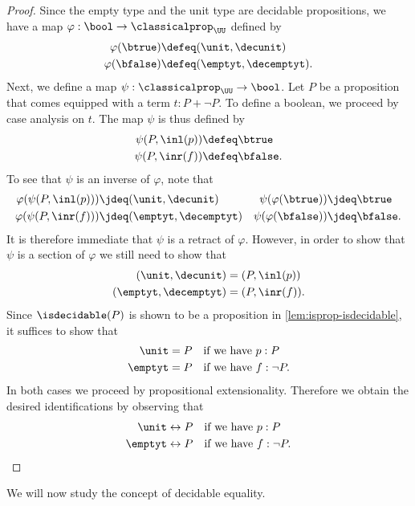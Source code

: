\begin{proof}
  Since the empty type and the unit type are decidable propositions, we have a map $\varphi:\bool\to\classicalprop_\UU$ defined by
  \begin{align*}
    \varphi(\btrue) & \defeq (\unit,\decunit) \\
    \varphi(\bfalse) & \defeq (\emptyt,\decemptyt).
  \end{align*}
  Next, we define a map $\psi:\classicalprop_\UU\to\bool$. Let $P$ be a proposition that comes equipped with a term $t:P+\neg P$. To define a boolean, we proceed by case analysis on $t$. The map $\psi$ is thus defined by
  \begin{align*}
    \psi(P,\inl(p)) & \defeq \btrue \\
    \psi(P,\inr(f)) & \defeq \bfalse.
  \end{align*}
  To see that $\psi$ is an inverse of $\varphi$, note that
  \begin{align*}
    \varphi(\psi(P,\inl(p))) & \jdeq (\unit,\decunit) & \psi(\varphi(\btrue)) & \jdeq \btrue \\
    \varphi(\psi(P,\inr(f))) & \jdeq (\emptyt,\decemptyt) & \psi(\varphi(\bfalse)) & \jdeq \bfalse.
  \end{align*}
  It is therefore immediate that $\psi$ is a retract of $\varphi$. However, in order to show that $\psi$ is a section of $\varphi$ we still need to show that
  \begin{align*}
    (\unit,\decunit) & = (P,\inl(p)) \\
    (\emptyt,\decemptyt) & = (P,\inr(f)).
  \end{align*}
  Since $\isdecidable(P)$ is shown to be a proposition in \cref{lem:isprop-isdecidable}, it suffices to show that
  \begin{align*}
    \unit & = P & & \text{if we have }p:P \\
    \emptyt & = P & & \text{if we have }f:\neg P.
  \end{align*}
  In both cases we proceed by propositional extensionality. Therefore we obtain the desired identifications by observing that
  \begin{align*}
    \unit & \leftrightarrow P & & \text{if we have }p:P \\
    \emptyt & \leftrightarrow P & & \text{if we have }f:\neg P.\qedhere
  \end{align*}
\end{proof}

We will now study the concept of decidable equality.

